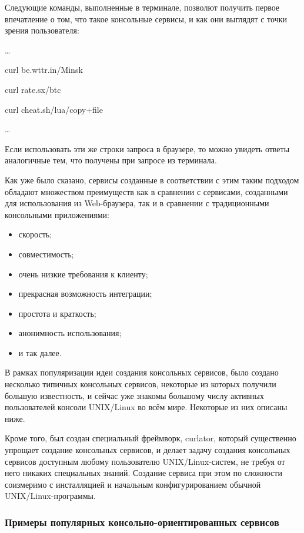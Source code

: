 \documentclass[10pt, a5paper]{article}
\begin{document}
Следующие команды, выполненные в терминале, позволют получить первое впечатление о том, что такое консольные сервисы, и как они выглядят с точки зрения пользователя:

\ldots

    curl be.wttr.in/Minsk

    curl rate.sx/btc

    curl cheat.sh/lua/copy+file

\ldots

Если использовать эти же строки запроса в браузере, то можно увидеть ответы
аналогичные тем, что получены при запросе из терминала.

Как уже было сказано, сервисы созданные в соответствии с этим таким подходом
обладают множеством преимуществ как в сравнении с сервисами, созданными для использования из Web-браузера, так и в сравнении с традиционными консольными приложениями:

\begin{itemize}
  \item скорость;
  \item совместимость;
  \item очень низкие требования к клиенту;
  \item прекрасная возможность интеграции;
  \item простота и краткость;
  \item анонимность использования;
  \item и так далее.
\end{itemize}

В рамках популяризации идеи создания консольных сервисов, было создано
несколько типичных консольных сервисов, некоторые из которых получили большую
известность, и сейчас уже знакомы большому числу активных пользователей консоли UNIX/Linux во всём мире. Некоторые из них описаны ниже.

Кроме того, был создан специальный фреймворк, curlator, который существенно
упрощает создание консольных сервисов, и делает задачу создания консольных
сервисов доступным любому пользователю UNIX/Linux-систем, не требуя от него
никаких специальных знаний. Создание сервиса при этом по сложности соизмеримо с инсталляцией и начальным конфигурированием обычной UNIX/Linux-программы.

\subsubsection*{Примеры популярных консольно-ориентированных сервисов}
\end{document}
